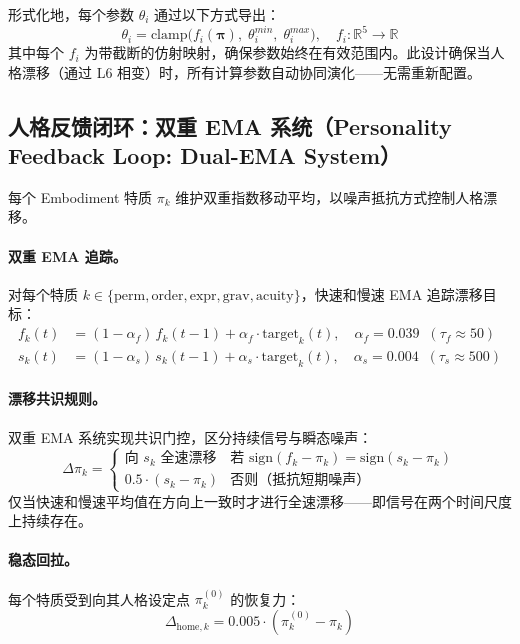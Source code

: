 \documentclass[11pt]{article}
\begin{document}
形式化地，每个参数 $\theta_i$ 通过以下方式导出：
\begin{equation}
\theta_i = \text{clamp}\bigl(f_i(\boldsymbol{\pi}),\; \theta_i^{min},\; \theta_i^{max}\bigr), \quad f_i: \mathbb{R}^5 \to \mathbb{R}
\end{equation}
其中每个 $f_i$ 为带截断的仿射映射，确保参数始终在有效范围内。此设计确保当人格漂移（通过 L6 相变）时，所有计算参数自动协同演化——无需重新配置。

\subsection{人格反馈闭环：双重 EMA 系统（Personality Feedback Loop: Dual-EMA System）}
\label{subsec:personality-feedback}

每个 Embodiment 特质 $\pi_k$ 维护双重指数移动平均，以噪声抵抗方式控制人格漂移。

\paragraph{双重 EMA 追踪。}
对每个特质 $k \in \{\text{perm}, \text{order}, \text{expr}, \text{grav}, \text{acuity}\}$，快速和慢速 EMA 追踪漂移目标：
\begin{align}
f_k(t) &= (1 - \alpha_f)\, f_k(t-1) + \alpha_f \cdot \text{target}_k(t), \quad \alpha_f = 0.039 \;\;(\tau_f \approx 50) \\
s_k(t) &= (1 - \alpha_s)\, s_k(t-1) + \alpha_s \cdot \text{target}_k(t), \quad \alpha_s = 0.004 \;\;(\tau_s \approx 500)
\end{align}

\paragraph{漂移共识规则。}
双重 EMA 系统实现共识门控，区分持续信号与瞬态噪声：
\begin{equation}
\Delta\pi_k = \begin{cases}
\text{向 } s_k \text{ 全速漂移} & \text{若 } \text{sign}(f_k - \pi_k) = \text{sign}(s_k - \pi_k) \\
0.5 \cdot (s_k - \pi_k) & \text{否则（抵抗短期噪声）}
\end{cases}
\end{equation}
仅当快速和慢速平均值在方向上一致时才进行全速漂移——即信号在两个时间尺度上持续存在。

\paragraph{稳态回拉。}
每个特质受到向其人格设定点 $\pi_k^{(0)}$ 的恢复力：
\begin{equation}
\Delta_{\text{home},k} = 0.005 \cdot (\pi_k^{(0)} - \pi_k)
\end{equation}
\end{document}
